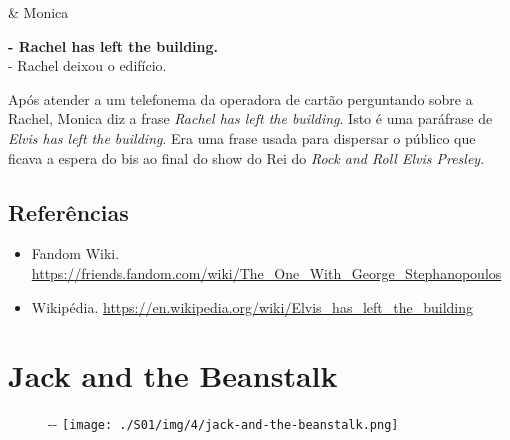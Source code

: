 \begin{tcolorbox}[enhanced,center upper,
    drop fuzzy shadow southeast, boxrule=0.3pt,
    lower separated=false, breakable,
    colframe=black!30!dialogoBorder,colback=white]
\begin{minipage}[c]{0.16\linewidth}
   & \centering \scriptsize{Monica}
\end{minipage}
\hfill
\begin{minipage}[c]{0.8\linewidth}
  \textbf{- Rachel has left the building.}\\
  - Rachel deixou o edifício.
\end{minipage}
\end{tcolorbox}

Após atender a um telefonema da operadora de cartão perguntando sobre a
Rachel, Monica diz a frase \emph{Rachel has left the building}. Isto é
uma paráfrase de \emph{Elvis has left the building}. Era uma frase usada
para dispersar o público que ficava a espera do bis ao final do show do
Rei do \emph{Rock and Roll Elvis Presley}.

\hypertarget{referuxeancias-1}{%
\subsection{Referências}\label{referuxeancias-1}}

\begin{itemize}
\tightlist
\item
  \sloppy Fandom Wiki. \url{https://friends.fandom.com/wiki/The_One_With_George_Stephanopoulos}
\item
  \sloppy Wikipédia. \url{https://en.wikipedia.org/wiki/Elvis_has_left_the_building}
\end{itemize}

\hypertarget{jack-and-the-beanstalk}{%
\section{Jack and the Beanstalk}\label{jack-and-the-beanstalk}}

\begin{figure}[!ht]
  \begin{adjustwidth}{-\oddsidemargin-1in}{-\rightmargin}
    \centering
    \texttt{[image: ./S01/img/4/jack-and-the-beanstalk.png]}
  \end{adjustwidth}
\end{figure}

